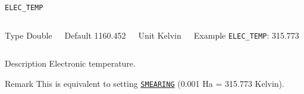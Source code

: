\documentclass[xcolor=dvipsnames,t]{beamer}
\begin{document}
\begin{frame}[allowframebreaks]{\texttt{ELEC\_TEMP}} \label{ELEC_TEMP}
\vspace*{-12pt}
\begin{columns}
\begin{block}{Type}
Double
\end{block}

\begin{block}{Default}
1160.452
\end{block}

\begin{block}{Unit}
Kelvin
\end{block}

\begin{block}{Example}
\texttt{ELEC\_TEMP}: 315.773
\end{block}
\end{columns}

\begin{block}{Description}
Electronic temperature. 
\end{block}

\begin{block}{Remark}
This is equivalent to setting \hyperlink{SMEARING}{\texttt{SMEARING}} (0.001 Ha = 315.773 Kelvin).
\end{block}

\end{frame}
\end{document}
